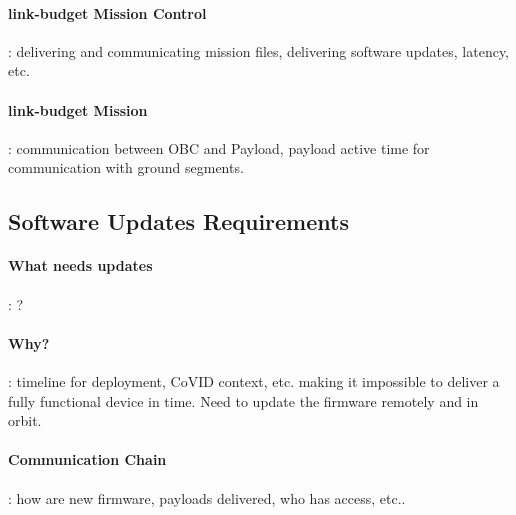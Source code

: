 \paragraph*{link-budget Mission Control}: delivering and communicating mission
files, delivering software updates, latency, etc.
\paragraph*{link-budget Mission}: communication between OBC and Payload, payload
active time for communication with ground segments.

\subsection{Software Updates Requirements}
\paragraph*{What needs updates}: ?
\paragraph*{Why?}: timeline for deployment, CoVID context, etc. making it impossible
to deliver a fully functional device in time. Need to update the firmware remotely
and in orbit.
\paragraph*{Communication Chain}: how are new firmware, payloads delivered,
who has access, etc..

